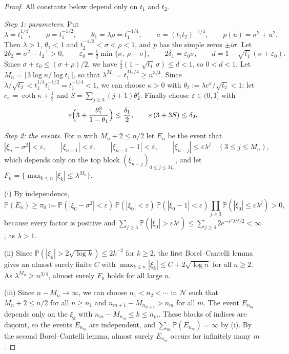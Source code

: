 \documentclass[11pt]{amsart}
\theoremstyle{definition}
\theoremstyle{remark}
\numberwithin{equation}{section}
\newcommand{\PP}{\mathbb{P}}
\newcommand{\eps}{\varepsilon}
\begin{document}
\begin{proof}
All constants below depend only on $t_1$ and $t_2$.

\emph{Step 1: parameters.} Put
\[
\lambda=t_1^{1/4},\qquad\rho=t_1^{-1/2},\qquad\theta_1=\lambda\rho=t_1^{-1/4},\qquad\sigma=(t_1t_2)^{-1/4},\qquad p(u)=\sigma^2+u^2 .
\]
Then $\lambda>1$, $\theta_1<1$ and $t_2^{-1/2}<\sigma<\rho<1$, and $p$ has the simple zeros $\pm i\sigma$. Let
\[
2\delta_2=\sigma^2-t_2^{-1}>0,\qquad\eps_0=\tfrac12\min\{\sigma,\ \rho-\sigma\},\qquad2\delta_1=\eps_0\sigma,\qquad d=1-\sqrt{t_1}\,(\sigma+\eps_0).
\]
Since $\sigma+\eps_0\le(\sigma+\rho)/2$, we have $\frac12(1-\sqrt{t_1}\,\sigma)\le d<1$, so $0<d<1$. Let $M_n=\lceil3\log n/\log t_1\rceil$, so that $\lambda^{M_n}=t_1^{M_n/4}\ge n^{3/4}$. Since $\lambda/\sqrt{t_2}<t_1^{1/4}t_1^{-1/2}=t_1^{-1/4}<1$, we can choose $\kappa>0$ with $\theta_2:=\lambda e^{\kappa}/\sqrt{t_2}<1$; let $c_\kappa=\coth\kappa+\frac12$ and $S=\sum_{j\ge3}(j+1)\theta_2^j$. Finally choose $\eps\in(0,1]$ with
\[
\eps\Bigl(3+\frac{\theta_1^3}{1-\theta_1}\Bigr)\le\frac{\delta_1}2,\qquad\eps\,(3+3S)\le\delta_2 .
\]

\emph{Step 2: the events.} For $n$ with $M_n+2\le n/2$ let $E_n$ be the event that
\[
|\xi_n-\sigma^2|<\eps,\qquad|\xi_{n-1}|<\eps,\qquad|\xi_{n-2}-1|<\eps,\qquad|\xi_{n-j}|\le\eps\lambda^j\quad(3\le j\le M_n),
\]
which depends only on the top block $(\xi_{n-j})_{0\le j\le M_n}$, and let $F_n=\{\max_{k\le n}|\xi_k|\le\lambda^{M_n}\}$.

(i) By independence,
\[
\PP(E_n)\ge\pi_0:=\PP(|\xi_0-\sigma^2|<\eps)\,\PP(|\xi_0|<\eps)\,\PP(|\xi_0-1|<\eps)\prod_{j\ge3}\PP(|\xi_0|\le\eps\lambda^j)>0,
\]
because every factor is positive and $\sum_{j\ge3}\PP(|\xi_0|>\eps\lambda^j)\le\sum_{j\ge3}2e^{-\eps^2\lambda^{2j}/2}<\infty$, as $\lambda>1$.

(ii) Since $\PP(|\xi_k|>2\sqrt{\log k})\le2k^{-2}$ for $k\ge2$, the first Borel--Cantelli lemma gives an almost surely finite $C$ with $\max_{k\le n}|\xi_k|\le C+2\sqrt{\log n}$ for all $n\ge2$. As $\lambda^{M_n}\ge n^{3/4}$, almost surely $F_n$ holds for all large $n$.

(iii) Since $n-M_n\to\infty$, we can choose $n_1<n_2<\cdots$ in $\mathcal N$ such that $M_n+2\le n/2$ for all $n\ge n_1$ and $n_{m+1}-M_{n_{m+1}}>n_m$ for all $m$. The event $E_{n_m}$ depends only on the $\xi_k$ with $n_m-M_{n_m}\le k\le n_m$. These blocks of indices are disjoint, so the events $E_{n_m}$ are independent, and $\sum_m\PP(E_{n_m})=\infty$ by (i). By the second Borel--Cantelli lemma, almost surely $E_{n_m}$ occurs for infinitely many $m$.


\end{proof}
\end{document}
